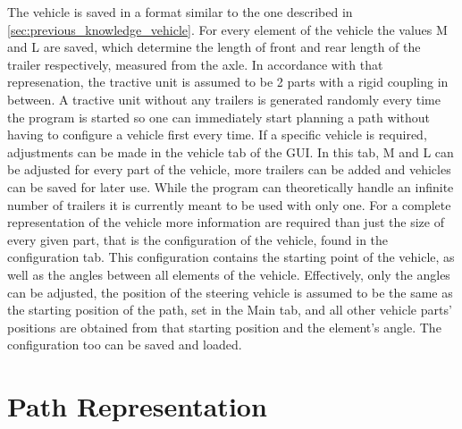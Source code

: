 The vehicle is saved in a format similar to the one described in \ref{sec:previous_knowledge_vehicle}. For every element of the vehicle the values M and L are saved, which determine the length of front and rear length of the trailer respectively, measured from the axle. In accordance with that represenation, the tractive unit is assumed to be 2 parts with a rigid coupling in between. A tractive unit without any trailers is generated randomly every time the program is started so one can immediately start planning a path without having to configure a vehicle first every time. If a specific vehicle is required, adjustments can be made in the vehicle tab of the GUI. In this tab, M and L can be adjusted for every part of the vehicle, more trailers can be added and vehicles can be saved for later use. While the program can theoretically handle an infinite number of trailers it is currently meant to be used with only one.
For a complete representation of the vehicle more information are required than just the size of every given part, that is the configuration of the vehicle, found in the configuration tab. This configuration contains the starting point of the vehicle, as well as the angles between all elements of the vehicle. Effectively, only the angles can be adjusted, the position of the steering vehicle is assumed to be the same as the starting position of the path, set in the Main tab, and all other vehicle parts' positions are obtained from that starting position and the element's angle. The configuration too can be saved and loaded.

\section{Path Representation}
\label{sec:path_representation}

